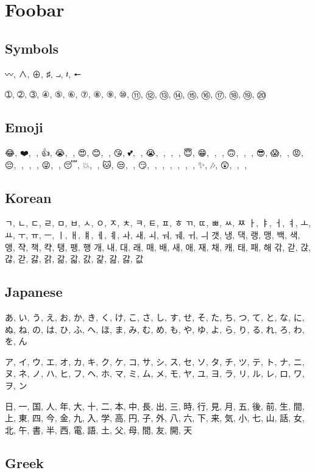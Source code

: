 \documentclass[11pt,a4paper,twoside]{book}
\begin{document}
\section{Foobar}

\subsection{Symbols}

〰, ∧, ⊕, ♯, ⨼, 𝄽, 🠔

➀, ➁, ➂, ④, ⑤, ⑥, ⑦, ⑧, ⑨, ⑩, ⑪, ⑫, ⑬, ⑭, ⑮, ⑯, ⑰, ⑱, ⑲, ⑳

\subsection{Emoji}

😂, ❤️, 🤣, 👍, 😭, 🙏, 😍, 😊, 🥰, 😘, 💕, 🥺, 😭, 🤔, 🥳, 🎉, 😇, 😁, 🤩, 💪, 🙃, 🤗, 🥺, 😎, 😱, 🤭, 😡, 😔, 🌟, 💜, 🤯, 😜, 👀, 😴, 💥, 🖤, 🐱, 😒, 👋, 😏, 🤨, 🥺, 🥵, 👑, 💩, 💓, ✨, 🎶, 😲, 🎂, 💩, 🍃

\subsection{Korean}
ㄱ, ㄴ, ㄷ, ㄹ, ㅁ, ㅂ, ㅅ, ㅇ, ㅈ, ㅊ, ㅋ, ㅌ, ㅍ, ㅎ
ㄲ, ㄸ, ㅃ, ㅆ, ㅉ
ㅏ, ㅑ, ㅓ, ㅕ, ㅗ, ㅛ, ㅜ, ㅠ, ㅡ, ㅣ, ㅐ, ㅒ, ㅔ, ㅖ, ㅘ, ㅙ, ㅚ, ㅝ, ㅞ, ㅟ, ㅢ
갯, 냉, 댁, 랭, 맹, 백, 색, 앵, 쟉, 책, 캭, 탱, 팽, 행
개, 내, 대, 래, 매, 배, 새, 애, 재, 채, 캐, 태, 패, 해
갂, 갇, 갅, 갆, 갇, 갏, 갉, 갊, 갋, 갌, 갍, 갎, 갏, 값

\subsection{Japanese}
あ, い, う, え, お, か, き, く, け, こ, さ, し, す, せ, そ, た, ち, つ, て, と, な, に, ぬ, ね, の, は, ひ, ふ, へ, ほ, ま, み, む, め, も, や, ゆ, よ, ら, り, る, れ, ろ, わ, を, ん

ア, イ, ウ, エ, オ, カ, キ, ク, ケ, コ, サ, シ, ス, セ, ソ, タ, チ, ツ, テ, ト, ナ, ニ, ヌ, ネ, ノ, ハ, ヒ, フ, ヘ, ホ, マ, ミ, ム, メ, モ, ヤ, ユ, ヨ, ラ, リ, ル, レ, ロ, ワ, ヲ, ン

日, 一, 国, 人, 年, 大, 十, 二, 本, 中, 長, 出, 三, 時, 行, 見, 月, 五, 後, 前, 生, 間, 上, 東, 四, 今, 金, 九, 入, 学, 高, 円, 子, 外, 八, 六, 下, 来, 気, 小, 七, 山, 話, 女, 北, 午, 書, 半, 西, 電, 語, 土, 父, 母, 間, 友, 開, 天

\subsection{Greek}
\end{document}
